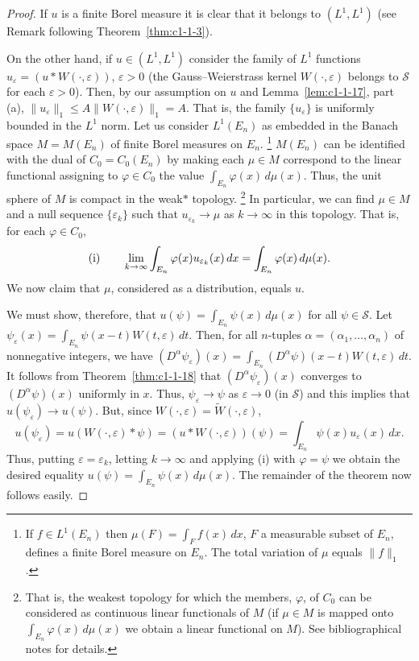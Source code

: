 \begin{proof}
If $u$ is a finite Borel measure it is clear that it belongs to
$(L^{1}, L^{1})$ (see Remark following Theorem~\ref{thm:c1-1-3}).

On the other hand, if $u \in (L^{1}, L^{1})$ consider the family of $L^{1}$
functions $u_{\varepsilon} = (u * W(\cdot, \varepsilon))$, $\varepsilon > 0$
(the Gauss--Weierstrass kernel $W(\cdot, \varepsilon)$ belongs to
$\mathscr{S}$ for each $\varepsilon > 0$). Then, by our assumption on $u$ and
Lemma~\ref{lem:c1-1-17}, part (a),
$\|u_{\varepsilon}\|_{1} \leq A\|W(\cdot, \varepsilon)\|_{1} = A$. That is,
the family $\{u_{\varepsilon}\}$ is uniformly bounded in the $L^{1}$ norm. Let
us consider $L^{1}(E_{n})$ as embedded in the Banach space $M = M(E_{n})$ of
finite Borel measures on $E_{n}$.%
\footnote{If $f \in L^{1}(E_{n})$ then $\mu(F) = \int_{F} f(x) \, dx$, $F$ a
measurable subset of $E_{n}$, defines a finite Borel measure on $E_{n}$. The
total variation of $\mu$ equals $\|f\|_{1}$.}
$M(E_{n})$ can be identified with the dual of $C_{0} = C_{0}(E_{n})$ by making
each $\mu \in M$ correspond to the linear functional assigning to
$\varphi \in C_{0}$ the value $\int_{E_{n}} \varphi(x) \, d\mu(x)$. Thus, the
unit sphere of $M$ is compact in the weak$\ast$ topology.%
\footnote{That is, the weakest topology for which the members, $\varphi$, of
$C_{0}$ can be considered as continuous linear functionals of $M$ (if
$\mu \in M$ is mapped onto $\int_{E_{n}} \varphi(x) \, d\mu(x)$ we obtain a
linear functional on $M$). See bibliographical notes for details.}
In particular, we can find $\mu \in M$ and a null sequence
$\{\varepsilon_{k}\}$ such that $u_{\varepsilon_{k}} \to \mu$ as
$k \to \infty$ in this topology. That is, for each $\varphi \in C_{0}$,
\[
\textup{(i)}\qquad
\lim_{k\to\infty}\int_{E_{n}}\varphi(x)u_{\varepsilon_{k}}(x)\,dx
=\int_{E_{n}}\varphi(x)\,d\mu(x).
\]
We now claim that $\mu$, considered as a distribution, equals $u$.

We must show, therefore, that $u(\psi) = \int_{E_{n}} \psi(x) \, d\mu(x)$ for
all $\psi \in \mathscr{S}$. Let
$\psi_{\varepsilon}(x) = \int_{E_{n}} \psi(x - t)W(t, \varepsilon) \, dt$.
Then, for all $n$-tuples $\alpha = (\alpha_{1}, \ldots, \alpha_{n})$ of
nonnegative integers, we have
$(D^{\alpha}\psi_{\varepsilon})(x) = \int_{E_{n}} (D^{\alpha}\psi)(x - t)W(t, \varepsilon) \, dt$.
It follows from Theorem~\ref{thm:c1-1-18} that $(D^{\alpha}\psi_{\varepsilon})(x)$
converges to $(D^{\alpha}\psi)(x)$ uniformly in $x$. Thus,
$\psi_{\varepsilon} \to \psi$ as $\varepsilon \to 0$ (in $\mathscr{S}$) and
this implies that $u(\psi_{\varepsilon}) \to u(\psi)$. But, since
$W(\cdot, \varepsilon) = \tilde{W}(\cdot, \varepsilon)$,
\[
u(\psi_{\varepsilon})=u(W(\cdot,\varepsilon)*\psi)
=(u*W(\cdot,\varepsilon))(\psi)=\int_{E_{n}}\psi(x)u_{\varepsilon}(x)\,dx.
\]
Thus, putting $\varepsilon = \varepsilon_{k}$, letting $k \to \infty$ and
applying (i) with $\varphi = \psi$ we obtain the desired equality
$u(\psi) = \int_{E_{n}} \psi(x) \, d\mu(x)$. The remainder of the theorem now
follows easily.
\end{proof}

